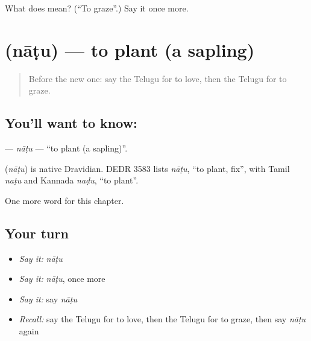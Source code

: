 \begin{tcolorbox}[breakable,colback=teal!4,colframe=teal!35!black,title={Before you move on}]
What does  mean? (\textquotedblleft{}To graze\textquotedblright{}.) Say it once more.
\end{tcolorbox}
\section[\texorpdfstring{\te{నాటు} (nāṭu)}{నాటు (nāṭu)}]{ (nāṭu) — to plant (a sapling)}

\label{lesson:TE-C282-natu}



\begin{quote}
Before the new one: say the Telugu for to love, then the Telugu for to graze.
\end{quote}

\subsection*{You'll want to know: }
\textbf{} — \emph{nāṭu} — \textquotedblleft{}to plant (a sapling)\textquotedblright{}.

\begin{cousinweb}
\textbf{} (\emph{nāṭu}) is native Dravidian. DEDR 3583 lists \emph{nāṭu}, \textquotedblleft{}to plant, fix\textquotedblright{}, with Tamil \emph{naṭu} and Kannada \emph{naḍu}, \textquotedblleft{}to plant\textquotedblright{}.
\end{cousinweb}

\begin{grammarlens}[title={What you've built}]
One more word for this chapter.
\end{grammarlens}

\subsection*{Your turn}
\begin{itemize}
\raggedright
  \item \emph{Say it:} \emph{nāṭu}
  \item \emph{Say it:} \emph{nāṭu}, once more
  \item \emph{Say it:} say \emph{nāṭu}
  \item \emph{Recall:} say the Telugu for to love, then the Telugu for to graze, then say \emph{nāṭu} again
\end{itemize}

